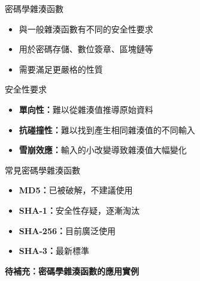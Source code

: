 \documentclass{beamer}
\begin{document}
\begin{frame}{密碼學雜湊函數}
\begin{itemize}
    \item 與一般雜湊函數有不同的安全性要求
    \item 用於密碼存儲、數位簽章、區塊鏈等
    \item 需要滿足更嚴格的性質
\end{itemize}

\vspace{1em}
\begin{block}{安全性要求}
\begin{itemize}
    \item \textbf{單向性：}難以從雜湊值推導原始資料
    \item \textbf{抗碰撞性：}難以找到產生相同雜湊值的不同輸入
    \item \textbf{雪崩效應：}輸入的小改變導致雜湊值大幅變化
\end{itemize}
\end{block}

\vspace{1em}
\begin{block}{常見密碼學雜湊函數}
\begin{itemize}
    \item \textbf{MD5：}已被破解，不建議使用
    \item \textbf{SHA-1：}安全性存疑，逐漸淘汰
    \item \textbf{SHA-256：}目前廣泛使用
    \item \textbf{SHA-3：}最新標準
\end{itemize}
\end{block}

\vspace{1em}
\textbf{待補充：密碼學雜湊函數的應用實例}
\end{frame}
\end{document}
